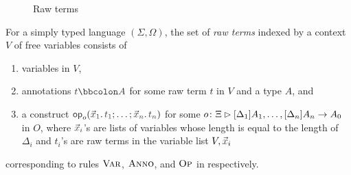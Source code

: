 \begin{definition}
\begin{figure}
  \centering
  \small
  \caption{Raw terms}
  \label{fig:raw-terms}
\end{figure}
  For a simply typed language $(\Sigma, \Omega)$, the set of \emph{raw terms} indexed by a context~$V$ of free variables consists of
  \begin{enumerate}
    \item variables in $V$,
    \item annotations $\isTerm{t \annotate A}$ for some raw term $t$ in $V$ and a type $A$, and
    \item a construct $\tmOpts$ for some $o\colon\Xi \rhd [\Delta_1]A_{1}, \ldots, [\Delta_{n}] A_{n} \to A_0$ in $O$, where $\vars{x}_{\isTerm{i}}$'s are lists of variables whose length is equal to the length of~$\Delta_i$ and $t_i$'s are raw terms in the variable list $V, \vars{x}_i$
  \end{enumerate}
  corresponding to rules $\textnormal{\textsc{Var}}$, $\textnormal{\textsc{Anno}}$, and $\textnormal{\textsc{Op}}$ in  respectively.
\end{definition}


